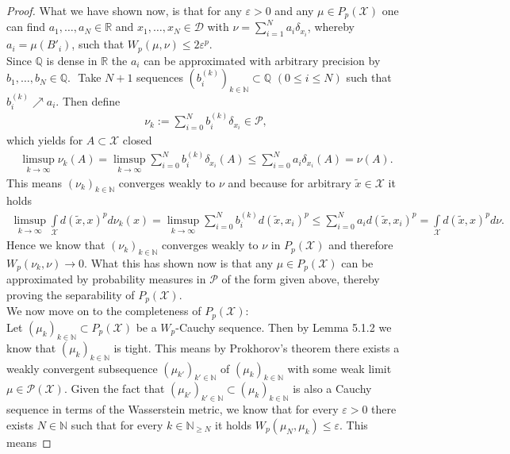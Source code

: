 \documentclass[11pt,a4paper]{article}
\begin{document}
\begin{proof}
What we have shown now, is that for any $\varepsilon>0$ and any $\mu\in{}P_p(\mathcal{X})$ one can find $a_1,\ldots,a_N\in\mathbb{R}$ and $x_1,\ldots,x_N\in\mathcal{D}$ with $\nu=\sum\limits_{i=1}^{N}a_i\delta_{x_i}$, whereby $a_i=\mu(B'_i)$, such that $W_p(\mu,\nu)\leq{}2\varepsilon^p$. \vspace{1.5em}\\
Since $\mathbb{Q}$ is dense in $\mathbb{R}$ the $a_i$ can be approximated with arbitrary precision by $b_1,\ldots,b_N\in\mathbb{Q}.\,\,$ 
Take $N+1$ sequences $(b^{(k)}_i)_{k\in\mathbb{N}}\subset\mathbb{Q}$ $(0\leq{}i\leq{}N)$ such that $b^{(k)}_i\nearrow{}a_i$. Then define 
\begin{align*}
\nu_k:=\sum\limits_{i=0}^{N}b^{(k)}_i\delta_{x_i}\in{}\mathcal{P},
\end{align*}
which yields for $A\subset\mathcal{X}$ closed
\begin{align*}
\limsup\limits_{k\rightarrow\infty}\nu_k(A) = \limsup\limits_{k\rightarrow\infty}\sum\limits_{i=0}^{N}b^{(k)}_i\delta_{x_i}(A)\leq\sum\limits_{i=0}^{N}a_i\delta_{x_i}(A)=\nu(A).
\end{align*}
This means $(\nu_k)_{k\in\mathbb{N}}$ converges weakly to $\nu$ and because for arbitrary $\tilde{x}\in\mathcal{X}$ it holds
\begin{align*}
\limsup\limits_{k\rightarrow\infty}\int\limits_{\mathcal{X}}d(\tilde{x},x)^pd\nu_k(x) = \limsup\limits_{k\rightarrow\infty}\sum\limits_{i=0}^{N}b^{(k)}_i{}d(\tilde{x},x_i)^p\leq\sum\limits_{i=0}^{N}a_i{}d(\tilde{x},x_i)^p = \int\limits_{\mathcal{X}}d(\tilde{x},x)^pd\nu.
\end{align*}
Hence we know that $(\nu_k)_{k\in\mathbb{N}}$ converges weakly to $\nu$ in $P_p(\mathcal{X})$ and therefore $W_p(\nu_k,\nu)\rightarrow{}0$. What this has shown now is that any $\mu\in{}P_p(\mathcal{X})$ can be approximated by probability measures in $\mathcal{P}$ of the form given above, thereby proving the separability of $P_p(\mathcal{X})$.\vspace{1em}\\
We now move on to the completeness of $P_p(\mathcal{X})$:\\
Let $(\mu_k)_{k\in\mathbb{N}}\subset{}P_p(\mathcal{X})$ be a $W_p$-Cauchy sequence. Then by Lemma 5.1.2 we know that $(\mu_k)_{k\in\mathbb{N}}$ is tight. This means by Prokhorov's theorem there exists a weakly convergent subsequence $(\mu_{k'})_{k'\in\mathbb{N}}$ of $(\mu_k)_{k\in\mathbb{N}}$ with some weak limit $\mu\in{}\mathcal{P(X)}$. Given the fact that $(\mu_{k'})_{k'\in\mathbb{N}}\subset{}(\mu_{k})_{k\in\mathbb{N}}$ is also a Cauchy sequence in terms of the Wasserstein metric, we know that for every $\varepsilon>0$ there exists $N\in\mathbb{N}$ such that for every $k\in\mathbb{N}_{\geq{}N}$ it holds $W_p(\mu_N,\mu_k)\leq\varepsilon$. This means

\end{proof}
\end{document}
